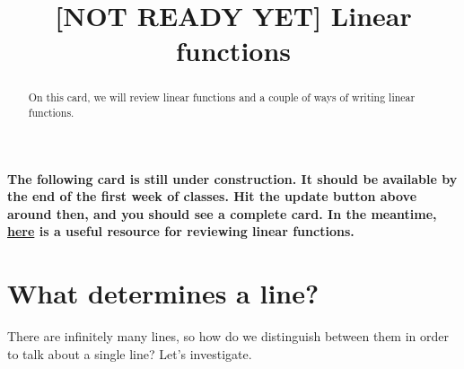 \documentclass{ximera}
\title[Dig-In:]{[NOT READY YET] Linear functions}
\begin{document}
\begin{abstract}
On this card, we will review linear functions and a couple of ways of writing linear functions. 
\end{abstract}
\maketitle

\textbf{The following card is still under construction.  It should be available by the end of the first week of classes.  Hit the update button above around then, and you should see a complete card.  In the meantime, \href{http://tutorial.math.lamar.edu/Classes/Alg/Lines.aspx}{here} is a useful resource for reviewing linear functions.}

\section{What determines a line?}

There are infinitely many lines, so how do we distinguish between them in order to talk about a single line?  Let's investigate. 
\end{document}
